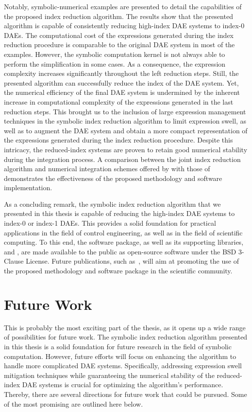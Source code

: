 Notably, symbolic-numerical examples are presented to detail the capabilities of the proposed index reduction algorithm. The results show that the presented algorithm is capable of consistently reducing high-index \ac{DAE} systems to index-0 \acp{DAE}. The computational cost of the expressions generated during the index reduction procedure is comparable to the original \ac{DAE} system in most of the examples. However, the \Maple{} symbolic computation kernel is not always able to perform the simplification in some cases. As a consequence, the expression complexity increases significantly throughout the left reduction steps. Still, the presented algorithm can successfully reduce the index of the \ac{DAE} system. Yet, the numerical efficiency of the final \ac{DAE} system is undermined by the inherent increase in computational complexity of the expressions generated in the last reduction steps. This brought us to the inclusion of large expression management techniques in the symbolic index reduction algorithm to limit expression swell, as well as to augment the \ac{DAE} system and obtain a more compact representation of the expressions generated during the index reduction procedure. Despite this intricacy, the reduced-index systems are proven to retain good numerical stability during the integration process. A comparison between the joint index reduction algorithm and numerical integration schemes offered by \Maple{} with those of \Indigo{} demonstrates the effectiveness of the proposed methodology and software implementation.

As a concluding remark, the symbolic index reduction algorithm that we presented in this thesis is capable of reducing the high-index \ac{DAE} systems to index-0 or index-1 \acp{DAE}. This provides a solid foundation for practical applications in the field of control engineering, as well as in the field of scientific computing. To this end, the \Indigo{} software package, as well as its supporting libraries, \LEM{} and \LAST{}, are made available to the public as open-source software under the BSD 3-Clause License. Future publications, such as~\cite{stocco2024imece_solution}, will aim at promoting the use of the proposed methodology and software package in the scientific community.

\section{Future Work}

This is probably the most exciting part of the thesis, as it opens up a wide range of possibilities for future work. The symbolic index reduction algorithm presented in this thesis is a solid foundation for future research in the field of symbolic computation. However, future efforts will focus on enhancing the algorithm to handle more complicated \ac{DAE} systems. Specifically, addressing expression swell mitigation techniques while guaranteeing the numerical stability of the reduced-index \ac{DAE} systems is crucial for optimizing the algorithm's performance. Thereby, there are several directions for future work that could be pursued. Some of the most promising are outlined here below.

